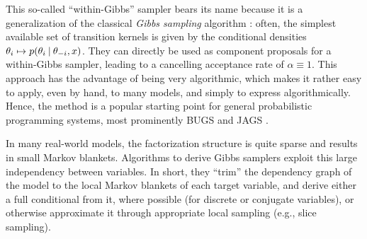 This so-called \enquote{within-Gibbs} sampler bears its name because it is a generalization of the
classical \emph{Gibbs sampling} algorithm \parencite{geman1984stochastic}: often, the simplest
available set of transition kernels is given by the conditional densities
\(\theta_{i} \mapsto p(\theta_{i} \:\vert\: \theta_{-i}, x)\). They can directly be used as component
proposals for a within-Gibbs sampler, leading to a cancelling acceptance rate of
\(\alpha \equiv 1\).  This approach has the advantage of being very algorithmic, which makes it
rather easy to apply, even by hand, to many models, and simply to express algorithmically.  Hence,
the method is a popular starting point for general probabilistic programming systems, most
prominently BUGS \parencite{lunn2000winbugs,lunn2009bugs} and JAGS \parencite{plummer2003jags}.

In many real-world models, the factorization structure is quite sparse and results in small Markov
blankets.  Algorithms to derive Gibbs samplers exploit this large independency between variables.
In short, they \enquote{trim} the dependency graph of the model to the local Markov blankets of each
target variable, and derive either a full conditional from it, where possible (for discrete or
conjugate variables), or otherwise approximate it through appropriate local sampling (e.g., slice
sampling).

